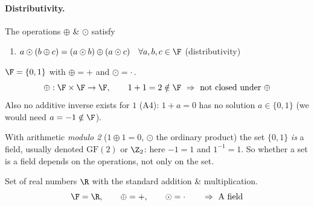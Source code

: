 \paragraph{Distributivity.} The operations $\oplus$ \& $\odot$ satisfy
\begin{enumerate}[label=(D),leftmargin=3.2em]
\item $a\odot(b\oplus c) = (a\odot b)\oplus(a\odot c) \quad \forall a,b,c\in\F$ \hfill (distributivity)
\end{enumerate}

\begin{example}
$\F=\{0,1\}$ with $\oplus = +$ and $\odot = \cdot$\,.
\[ \oplus: \F\times\F\to\F, \qquad 1+1=2\notin\F \ \Rightarrow\ \text{not closed under } \oplus \]
Also no additive inverse exists for $1$ (A4): $1+a=0$ has no solution $a\in\{0,1\}$ (we would need $a=-1\notin\F$).
\begin{insight}[Remark]
With arithmetic \emph{modulo 2} ($1\oplus1=0$, $\odot$ the ordinary product) the set $\{0,1\}$ \emph{is} a field, usually denoted $\mathrm{GF}(2)$ or $\Z_2$: here $-1=1$ and $1^{-1}=1$. So whether a set is a field depends on the operations, not only on the set.
\end{insight}
\end{example}

\begin{example}
Set of real numbers $\R$ with the standard addition \& multiplication.
\[ \F=\R, \qquad \oplus = +, \qquad \odot=\cdot \qquad \Rightarrow \text{ A field} \]
\end{example}

